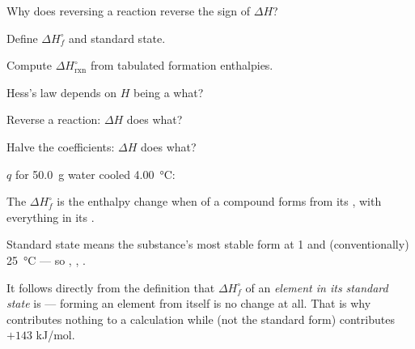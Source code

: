 \documentclass{apchem-notes}
\begin{document}
\begin{exitticket}
Why does reversing a reaction reverse the sign of $\Delta H$?
\end{exitticket}


\begin{objectives}
  \item Define $\Delta H^\circ_f$ and standard state.
  \item Compute $\Delta H^\circ_{\text{rxn}}$ from tabulated formation
        enthalpies.
\end{objectives}


\begin{warmup}[4]
  \item Hess's law depends on $H$ being a what?
  \item Reverse a reaction: $\Delta H$ does what?
  \item Halve the coefficients: $\Delta H$ does what?
  \item $q$ for \SI{50.0}{\gram} water cooled \SI{4.00}{\celsius}:
\end{warmup}



The  $\Delta H^\circ_f$ is the enthalpy
change when  of a compound forms from its
, with everything in its
.

Standard state means the substance's most stable form at
\SI{1}{\atm} and (conventionally) \SI{25}{\celsius} --- so
, , .

\begin{apcnote}
It follows directly from the definition that
$\Delta H^\circ_f$ of an \emph{element in its standard state} is
 --- forming an element from itself is no change at
all. That is why  contributes nothing to a calculation while
 (not the standard form) contributes $+143$ kJ/mol.
\end{apcnote}
\end{document}
